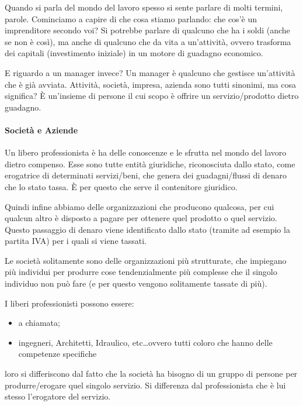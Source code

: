 Quando si parla del mondo del lavoro spesso si sente parlare di molti termini,
parole. Cominciamo a capire di che cosa stiamo parlando: che cos'è un
imprenditore secondo voi? Si potrebbe parlare di qualcuno che ha i soldi (anche
se non è così), ma anche di qualcuno che da vita a un'attività, ovvero
trasforma dei capitali (investimento iniziale) in un motore di guadagno
economico.

E riguardo a un manager invece? Un manager è qualcuno che gestisce un'attività
che è già avviata. Attività, società, impresa, azienda sono tutti sinonimi, ma
cosa significa? È un'insieme di persone il cui scopo è offrire un
servizio/prodotto dietro guadagno.

\paragraph*{Società e Aziende} Un libero professionista è ha delle conoscenze e
le sfrutta nel mondo del lavoro dietro compenso. Esse sono tutte entità
giuridiche, riconosciuta dallo stato, come erogatrice di determinati
servizi/beni, che genera dei guadagni/flussi di denaro che lo stato tassa. È per
questo che serve il contenitore giuridico.

Quindi infine abbiamo delle organizzazioni che producono qualcosa, per cui
qualcun altro è disposto a pagare per ottenere quel prodotto o quel servizio.
Questo passaggio di denaro viene identificato dallo stato (tramite ad esempio
la partita IVA) per i quali si viene tassati.

Le società solitamente sono delle organizzazioni più strutturate, che impiegano
più individui per produrre cose tendenzialmente più complesse che il singolo
individuo non può fare (e per questo vengono solitamente tassate di più).

I liberi professionisti possono essere:
\begin{itemize}
 \item a chiamata;
 \item ingegneri, Architetti, Idraulico, etc\dots ovvero tutti coloro che
hanno delle competenze specifiche
\end{itemize}
loro si differiscono dal fatto che la società ha bisogno di un gruppo di
persone per produrre/erogare quel singolo servizio. Si differenza dal
professionista che è lui stesso l'erogatore del servizio.

